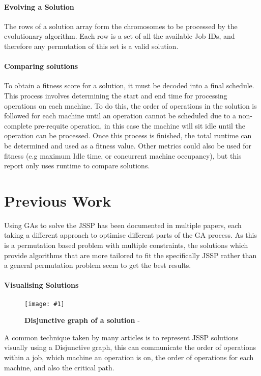 \documentclass[14pt]{acmsiggraph}
\newcommand{\figuremacroWH}[4]{
	\begin{figure}[h!] %
		\centering
		\texttt{[image: \#1]}
		\caption[#2]{\textbf{#2} - #3}
		\label{fig:#1}
	\end{figure}
}
\begin{document}
	\paragraph{Evolving a Solution}
	The rows of a solution array form the chromosomes to be processed by the evolutionary algorithm. Each row is a set of all the available Job IDs, and therefore any permutation of this set is a valid solution. 
	
	\paragraph{Comparing solutions}
	To obtain a fitness score for a solution, it must be decoded into a final schedule. This process involves determining the start and end time for processing operations on each machine. To do this, the order of operations in the solution is followed for each machine until an operation cannot be scheduled due to a non-complete pre-requite operation, in this case the machine will sit idle until the operation can be processed. Once this process is finished, the total runtime can be determined and used as a fitness value. Other metrics could also be used for fitness (e.g maximum Idle time, or concurrent machine occupancy), but this report only uses runtime to compare solutions.
	
	\section{Previous  Work}
	Using GAs to solve the JSSP has been documented in multiple papers, each taking a different approach to optimise different parts of the GA process. As this is a permutation based problem with multiple constraints, the solutions which provide algorithms that are more tailored to fit the specifically JSSP rather than a general permutation problem seem to get the best results.
	
	\paragraph{Visualising Solutions}
	\figuremacroWH
	{chart}
	{Disjunctive graph of a solution}
	{\cite{gao2011efficient}}
	{1.0}
	
	A common technique taken by many articles is to represent JSSP solutions visually using a Disjunctive graph, this can communicate the order of operations within a job, which machine an operation is on, the order of operations for each machine, and also the critical path.
	
\end{document}
